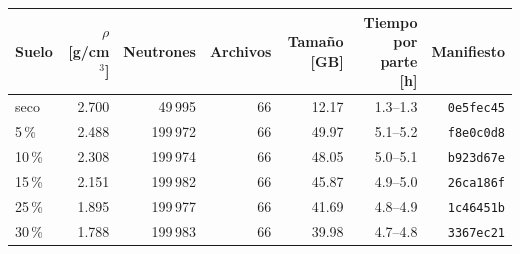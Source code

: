 \begin{tabular}{lrrrrrr}
\toprule
Suelo & $\rho$ [g/cm$^3$] & Neutrones & Archivos & Tamaño [GB] & Tiempo por parte [h] & Manifiesto \\
\midrule
seco & 2.700 & 49\,995 & 66 & 12.17 & 1.3--1.3 & \texttt{0e5fec45} \\
5\,\% & 2.488 & 199\,972 & 66 & 49.97 & 5.1--5.2 & \texttt{f8e0c0d8} \\
10\,\% & 2.308 & 199\,974 & 66 & 48.05 & 5.0--5.1 & \texttt{b923d67e} \\
15\,\% & 2.151 & 199\,982 & 66 & 45.87 & 4.9--5.0 & \texttt{26ca186f} \\
25\,\% & 1.895 & 199\,977 & 66 & 41.69 & 4.8--4.9 & \texttt{1c46451b} \\
30\,\% & 1.788 & 199\,983 & 66 & 39.98 & 4.7--4.8 & \texttt{3367ec21} \\
\bottomrule
\end{tabular}
